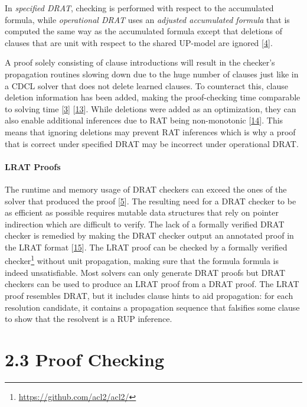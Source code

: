\documentclass[
]{report}
\begin{document}
In \emph{specified DRAT}, checking is performed with respect to the
accumulated formula, while \emph{operational DRAT} uses an
\emph{adjusted accumulated formula} that is computed the same way as the
accumulated formula except that deletions of clauses that are unit with
respect to the shared UP-model are ignored
{[}\protect\hyperlink{ref-rebola2018two}{4}{]}.

A proof solely consisting of clause introductions will result in the
checker's propagation routines slowing down due to the huge number of
clauses just like in a CDCL solver that does not delete learned clauses.
To counteract this, clause deletion information has been added, making
the proof-checking time comparable to solving time
{[}\protect\hyperlink{ref-Heule_2014}{3}{]}
{[}\protect\hyperlink{ref-Wetzler_2014}{13}{]}. While deletions were
added as an optimization, they can also enable additional inferences due
to RAT being non-monotonic
{[}\protect\hyperlink{ref-philipp_rebola_unsatproofs}{14}{]}. This means
that ignoring deletions may prevent RAT inferences which is why a proof
that is correct under specified DRAT may be incorrect under operational
DRAT.

\paragraph{LRAT Proofs}

The runtime and memory usage of DRAT checkers can exceed the ones of the
solver that produced the proof {[}\protect\hyperlink{ref-schur-5}{5}{]}.
The resulting need for a DRAT checker to be as efficient as possible
requires mutable data structures that rely on pointer indirection which
are difficult to verify. The lack of a formally verified DRAT checker is
remedied by making the DRAT checker output an annotated proof in the
LRAT format {[}\protect\hyperlink{ref-cruz2017efficient}{15}{]}. The
LRAT proof can be checked by a formally verified checker\footnote{\url{https://github.com/acl2/acl2/}}
without unit propagation, making sure that the formula formula is indeed
unsatisfiable. Most solvers can only generate DRAT proofs but DRAT
checkers can be used to produce an LRAT proof from a DRAT proof. The
LRAT proof resembles DRAT, but it includes clause hints to aid
propagation: for each resolution candidate, it contains a propagation
sequence that falsifies some clause to show that the resolvent is a RUP
inference.

\hypertarget{proof-checking}{%
\section{2.3 Proof Checking}\label{proof-checking}}
\end{document}
